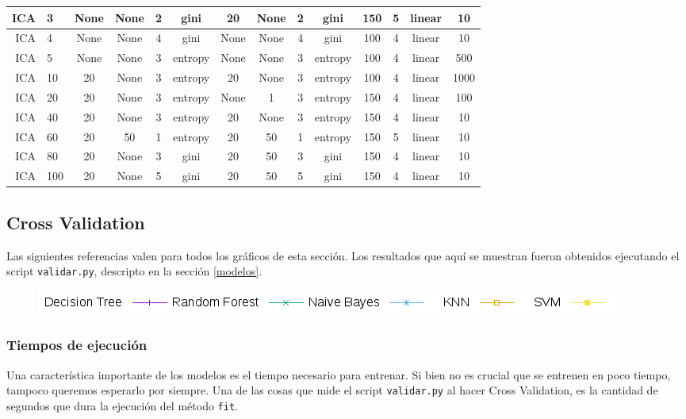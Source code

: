 \documentclass[10pt, a4paper]{article}
\begin{document}
\begin{scriptsize}
\begin{tabular}{|r|l||c|c|c|c||c|c|c|c|c||c||c|c|}
\hline
ICA & 3 & None & None & 2 & gini & 20 & None & 2 & gini & 150 & 5 & linear & 10 \\
\hline
ICA & 4 & None & None & 4 & gini & None & None & 4 & gini & 100 & 4 & linear & 10 \\
\hline
ICA & 5 & None & None & 3 & entropy & None & None & 3 & entropy & 100 & 4 & linear & 500 \\
\hline
ICA & 10 & 20 & None & 3 & entropy & 20 & None & 3 & entropy & 100 & 4 & linear & 1000 \\
\hline
ICA & 20 & 20 & None & 3 & entropy & None & 1 & 3 & entropy & 150 & 4 & linear & 100 \\
\hline
ICA & 40 & 20 & None & 3 & entropy & 20 & None & 3 & entropy & 150 & 4 & linear & 10 \\
\hline
ICA & 60 & 20 & 50 & 1 & entropy & 20 & 50 & 1 & entropy & 150 & 5 & linear & 10 \\
\hline
ICA & 80 & 20 & None & 3 & gini & 20 & 50 & 3 & gini & 150 & 4 & linear & 10 \\
\hline
ICA & 100 & 20 & None & 5 & gini & 20 & 50 & 5 & gini & 150 & 4 & linear & 10 \\
\hline
\end{tabular}
\end{scriptsize}

\subsection{Cross Validation}

Las siguientes referencias valen para todos los gráficos de esta sección. Los resultados que aquí se muestran fueron obtenidos ejecutando el script \texttt{validar.py}, descripto en la sección \ref{modelos}.

\begin{figure}[H]
\includegraphics[scale=0.6]{../src/data/refs.png}
\end{figure}

\subsubsection{Tiempos de ejecución}

Una característica importante de los modelos es el tiempo necesario para entrenar. Si bien no es crucial que se entrenen en poco tiempo, tampoco queremos esperarlo por siempre. Una de las cosas que mide el script \texttt{validar.py} al hacer Cross Validation, es la cantidad de segundos que dura la ejecución del método \texttt{fit}.
\end{document}
